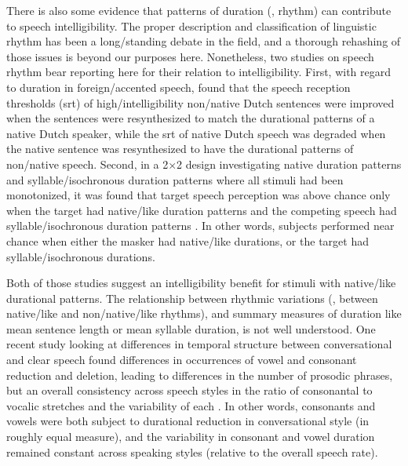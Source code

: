 There is also some evidence that patterns of duration (\ie, rhythm) can contribute to speech intelligibility.  The proper description and classification of linguistic rhythm has been a long\-/standing debate in the field, and a thorough rehashing of those issues is beyond our purposes here.\footnotemark{}  Nonetheless, two studies on speech rhythm bear reporting here for their relation to intelligibility.  First, with regard to duration in foreign\-/accented speech, \citet{QueneVanDelft2010} found that the speech reception thresholds (\ac{srt}) of high\-/intelligibility non\-/native Dutch sentences were improved when the sentences were resynthesized to match the durational patterns of a native Dutch speaker, while the \ac{srt} of native Dutch speech was degraded when the native sentence was resynthesized to have the durational patterns of non\-/native speech.  Second, in a 2×2 design investigating native duration patterns and syllable\-/isochronous duration patterns where all stimuli had been monotonized, it was found that target speech perception was above chance only when the target had native\-/like duration patterns and the competing speech had syllable\-/isochronous duration patterns \citep{CushingDellwo2010}.  In other words, subjects performed near chance when either the masker had native\-/like durations, or the target had syllable\-/isochronous durations.  

Both of those studies suggest an intelligibility benefit for stimuli with native\-/like durational patterns.  The relationship between rhythmic variations (\eg, between native\-/like and non\-/native\-/like rhythms), and summary measures of duration like mean sentence length or mean syllable duration, is not well understood.\footnotemark{}  One recent study looking at differences in temporal structure between conversational and clear speech found differences in occurrences of vowel and consonant reduction and deletion, leading to differences in the number of prosodic phrases, but an overall consistency across speech styles in the ratio of consonantal to vocalic stretches and the variability of each \citep{SmiljanicBradlow2008}.  In other words, consonants and vowels were both subject to durational reduction in conversational style (in roughly equal measure), and the variability in consonant and vowel duration remained constant across speaking styles (relative to the overall speech rate).

